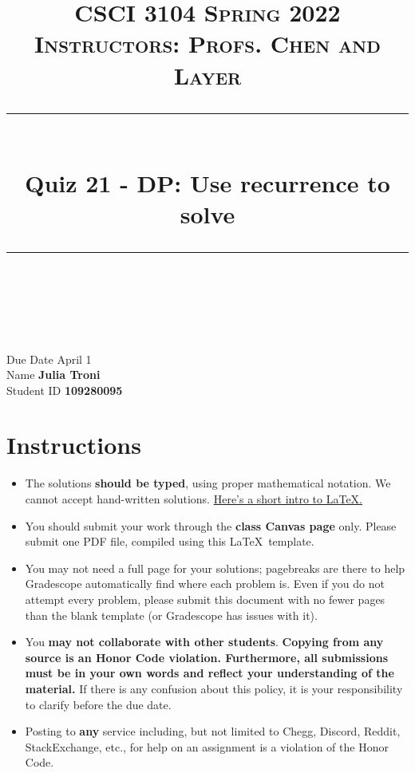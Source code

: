 \documentclass[11pt]{article}
\title{
\normalfont \normalsize 
\textsc{CSCI 3104 Spring 2022 \\ 
Instructors: Profs. Chen and Layer} \\
[10pt] 
\rule{\linewidth}{0.5pt} \\[6pt] 
\huge Quiz 21 - DP: Use recurrence to solve \\
\rule{\linewidth}{2pt}  \\[10pt]
}
\date{}
\theoremstyle{definition}
\theoremstyle{definition}
\theoremstyle{definition}
\begin{document}

\maketitle


\noindent
Due Date \dotfill April 1 \\
Name \dotfill \textbf{Julia Troni} \\
Student ID \dotfill \textbf{109280095} \\




\tableofcontents

\section{Instructions}
 \begin{itemize}
	\item The solutions \textbf{should be typed}, using proper mathematical notation. We cannot accept hand-written solutions. \href{http://ece.uprm.edu/~caceros/latex/introduction.pdf}{Here's a short intro to \LaTeX.}
	\item You should submit your work through the \textbf{class Canvas page} only. Please submit one PDF file, compiled using this \LaTeX \ template.
	\item You may not need a full page for your solutions; pagebreaks are there to help Gradescope automatically find where each problem is. Even if you do not attempt every problem, please submit this document with no fewer pages than the blank template (or Gradescope has issues with it).

	\item You \textbf{may not collaborate with other students}. \textbf{Copying from any source is an Honor Code violation. Furthermore, all submissions must be in your own words and reflect your understanding of the material.} If there is any confusion about this policy, it is your responsibility to clarify before the due date. 

	\item Posting to \textbf{any} service including, but not limited to Chegg, Discord, Reddit, StackExchange, etc., for help on an assignment is a violation of the Honor Code.

\end{itemize}
\end{document}

